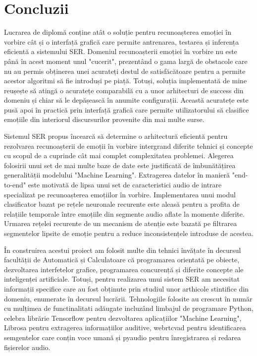 \documentclass[a4paper,12pt]{book}
\begin{document}
		\chapter{Concluzii}		
		Lucrarea de diplomă conține atât o soluție pentru recunoașterea emoției în vorbire cât și o interfață grafică care permite antrenarea, testarea și inferența eficientă a sistemului SER. Domeniul recunoașterii emoției în vorbire nu este până în acest moment unul "cucerit", prezentând o gama largă de obstacole care nu au permis obținerea unei acurateți destul de satisfăcătoare pentru a permite acestor algoritmi să fie introduși pe piață. Totuși, soluția implementată de mine reușește să atingă o acuratețe comparabilă cu a unor arhitecturi de success din domeniu și chiar să le depășească în anumite configurații. Această acuratețe este pusă apoi în practică prin interfață grafică care permite utilizatorului să clasifice emoțiile din interiorul discursurilor provenite din mai multe surse. \par		
		
		Sistemul SER propus încearcă să determine o arhitectură eficientă pentru rezolvarea recunoașterii de emoții în vorbire intergrand diferite tehnici și concepte cu scopul de a cuprinde cât mai complet complexitatea problemei. Alegerea folosirii unui set de mai multe baze de date este justificată de îmbunătățirea generalității modelului "Machine Learning". Extragerea datelor în manieră "end-to-end" este motivată de lipsa unui set de caracteristici audio de intrare specializat pe recunoașterea emoțiilor în vorbire. Implementarea unui modul clasificator bazat pe rețele neuronale recurente este aleasă pentru a profita de relațiile temporale între emoțiile din segmente audio aflate la momente diferite. Urmarea rețelei recurente de un mecanism de atenție este bazată pe filtrarea segmentelor lipsite de emoție pentru a reduce inconsistențele introduse de acestea. \par
		
		În construirea acestui proiect am folosit multe din tehnici învățate în decursul facultății de Automatică și Calculatoare că programarea orientată pe obiecte, dezvoltarea interfetelor grafice, programarea concurență și diferite concepte ale inteligenței artificiale. Totuși, pentru realizarea unui sistem SER am necesitat informații specifice care au fost obținute prin studiul unor arthicole stintifice din domeniu, enumerate în decursul lucrării. Tehnologiile folosite au crescut în număr cu mulțimea de functinalitati adăugate incluzând limbajul de programare Python, celebra librărie Tensorflow pentru dezvoltarea aplicațiilor "Machine Learning", Librosa pentru extragerea informațiilor auditive, webrtcvad pentru identificarea semgentelor care conțin voce umană și pyaudio pentru înregistrarea și redarea fișierelor audio. \par
		
\end{document}
